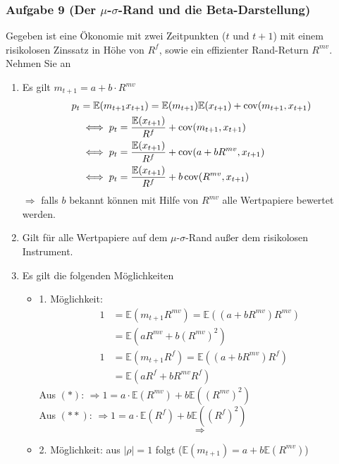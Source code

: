 \documentclass[12pt]{extreport} %
\theoremstyle{named}
\theoremstyle{nnamed}
\theoremstyle{itshape}
\theoremstyle{normal}
\begin{document}
\subsubsection*{Aufgabe 9 (Der $\mu$-$\sigma$-Rand und die Beta-Darstellung)}

Gegeben ist eine Ökonomie mit zwei Zeitpunkten ($t$ und $t+1$) mit einem risikolosen Zinssatz in Höhe von $R^f$, sowie ein effizienter Rand-Return $R^{mv}$. Nehmen Sie an

\begin{enumerate}
	\item Es gilt $m_{t+1} = a + b \cdot R^{mv}$
		\begin{align*}
			p_t & = \mathbb{E}(m_{t+1} x_{t+1}) = \mathbb{E}(m_{t+1}) \mathbb{E}(x_{t+1}) + \operatorname{cov}(m_{t+1}, x_{t+1}) \\
			& \iff p_{t} = \frac{\mathbb{E}(x_{t+1})}{R^f} + \operatorname{cov}(m_{t+1}, x_{t+1}) \\
			& \iff p_{t} = \frac{\mathbb{E}(x_{t+1})}{R^f} + \operatorname{cov}(a + b R^{mv}, x_{t+1})\\
			& \iff p_{t} = \frac{\mathbb{E}(x_{t+1})}{R^f} + b \operatorname{cov}(R^{mv}, x_{t+1})
		\end{align*}
		$\Rightarrow$ falls $b$ bekannt können mit Hilfe von $R^{mv}$ alle Wertpapiere bewertet werden.
	\item Gilt für alle Wertpapiere auf dem $\mu$-$\sigma$-Rand außer dem risikolosen Instrument.
	\item Es gilt die folgenden Möglichkeiten
		\begin{itemize}
			\item 1. Möglichkeit: 
					\begin{align*}
					1 & = \mathbb{E}(m_{t+1} R^{mv}) = \mathbb{E}\left((a + b R^{mv}) R^{mv} \right) \\
					& = \mathbb{E}\left( a R^{mv} + b \left(R^{mv} \right)^2 \right)   \tag*{$(*)$} ~\\
					1 & = \mathbb{E}(m_{t+1} R^{f}) = \mathbb{E}\left((a + b R^{mv}) R^{f} \right) \\
					& = \mathbb{E}\left( a R^{f} + b R^{mv} R^f \right)   \tag*{$(**)$}
				\end{align*}
				Aus $(*)$: $\Rightarrow 1 = a \cdot \mathbb{E}(R^{mv}) + b \mathbb{E}\left(\left(R^{mv} \right)^2 \right)$ ~\\
				Aus $(**)$: $\Rightarrow 1 = a \cdot \mathbb{E}(R^{f}) + b \mathbb{E}\left(\left(R^{f} \right)^2 \right)$
				$$\Rightarrow$$
			\item 2. Möglichkeit: aus $|\rho| = 1$ folgt ($\mathbb{E}(m_{t+1}) = a + b \mathbb{E}(R^{mv})$)

\end{itemize}
\end{enumerate}
\end{document}
